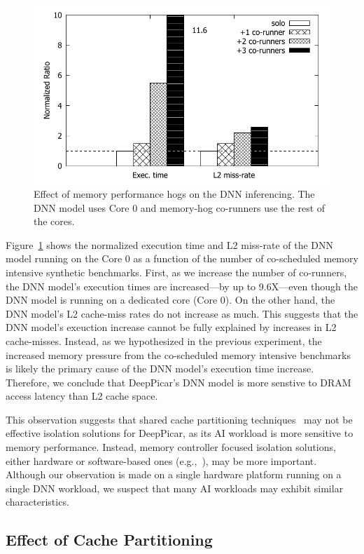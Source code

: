\begin{figure}[h]
  \centering
  \includegraphics[width=.7\textwidth]{figs/perf_vs_bandwidth}
  \caption{Effect of memory performance hogs on the DNN
    inferencing. The DNN model uses Core 0 and memory-hog co-runners
    use the rest of the cores.}
  \label{fig:}
\end{figure}

Figure~\ref{fig:} shows the normalized execution time and L2 miss-rate
of the DNN model running on the Core 0 as a function of the number of
co-scheduled memory intensive synthetic benchmarks. First, as we
increase the number of co-runners, the DNN model's execution times are
increased---by up to 9.6X---even though the DNN model is running on a
dedicated core (Core 0). On the other hand, the DNN model's L2
cache-miss rates do not increase as much. This suggests that
the DNN model's exeuction increase cannot be fully explained by
increases in L2 cache-misses. Instead, as we hypothesized in the previous
experiment, the increased memory pressure from the co-scheduled memory
intensive benchmarks is likely the primary cause of the DNN model's execution
time increase. Therefore, we conclude that DeepPicar's DNN model is
more senstive to DRAM access latency than L2 cache space.

This observation suggests that shared cache partitioning
techniques~\cite{Gracioli2015,Kim2016} may not be effective isolation
solutions for DeepPicar, as its AI workload is more sensitive to memory
performance. Instead, memory controller focused isolation solutions,
either hardware or software-based ones (e.g.,~\cite{Guo2017,Yun2013}),
may be more important. Although our observation is made on a single
hardware platform running on a single DNN workload, we suspect that
many AI workloads may exhibit similar characteristics.

\subsection{Effect of Cache Partitioning}

